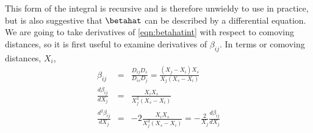 This form of the integral is recursive and is therefore unwieldy to use in practice, but is also suggestive that $\betahat$ can be described by a differential equation. We are going to take derivatives of \ref{eqn:betahatint} with respect to comoving distances, so it is first useful to examine derivatives of $\beta_{i j}$. In terms or comoving distances, $X_i$, 
\begin{eqnarray}
\beta_{i j} &=&\frac{D_{i j} D_s}{D_{i s} D_j} = \frac{(X_j - X_i) X_s}{X_j (X_s - X_i)} \\
\frac{d \beta_{i j}}{d X_j} &=& \frac{X_i X_s}{X_j^2 (X_s - X_i)}\\
\frac{d^2 \beta_{i j}}{d X_j} &=& -2 \frac{X_i X_s}{X_j^3 (X_s - X_i)} = -\frac{2}{X_j} \frac{d \beta_{i j}}{d X_j} \label{eqn:d2bethatdbetahat}
\end{eqnarray}
  
  